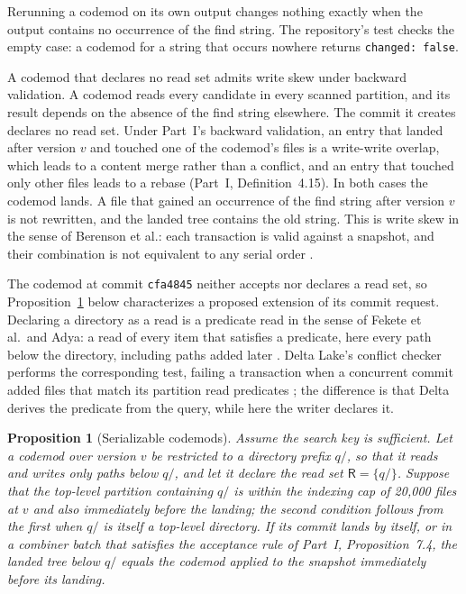 \documentclass[11pt,letterpaper]{article}
\newtheorem{proposition}[theorem]{Proposition}
\theoremstyle{definition}
\theoremstyle{remark}
\newcommand{\R}{\mathsf{R}}
\DeclareRobustCommand{\code}[1]{{\def\_{\textunderscore\allowbreak}\texttt{#1}}}
\begin{document}
Rerunning a codemod on its own output changes nothing exactly when the output contains no occurrence of the find string. The repository's test checks the empty case: a codemod for a string that occurs nowhere returns \code{changed: false}.

A codemod that declares no read set admits write skew under backward validation. A codemod reads every candidate in every scanned partition, and its result depends on the absence of the find string elsewhere. The commit it creates declares no read set. Under Part~I's backward validation, an entry that landed after version $v$ and touched one of the codemod's files is a write-write overlap, which leads to a content merge rather than a conflict, and an entry that touched only other files leads to a rebase (Part~I, Definition~4.15). In both cases the codemod lands. A file that gained an occurrence of the find string after version $v$ is not rewritten, and the landed tree contains the old string. This is write skew in the sense of Berenson et al.: each transaction is valid against a snapshot, and their combination is not equivalent to any serial order \cite{berenson1995critique}.

The codemod at commit \code{cfa4845} neither accepts nor declares a read set, so Proposition~\ref{prop:pdd:serializable} below characterizes a proposed extension of its commit request. Declaring a directory as a read is a predicate read in the sense of Fekete et al.\ and Adya: a read of every item that satisfies a predicate, here every path below the directory, including paths added later \cite[Definition~2.1]{fekete2005serializable} \cite{adya1999thesis}. Delta Lake's conflict checker performs the corresponding test, failing a transaction when a concurrent commit added files that match its partition read predicates \cite{deltaconflictsrc}; the difference is that Delta derives the predicate from the query, while here the writer declares it.

\begin{proposition}[Serializable codemods]
\label{prop:pdd:serializable}
Assume the search key is sufficient. Let a codemod over version $v$ be restricted to a directory prefix $q/$, so that it reads and writes only paths below $q/$, and let it declare the read set $\R=\{q/\}$. Suppose that the top-level partition containing $q/$ is within the indexing cap of 20,000 files at $v$ and also immediately before the landing; the second condition follows from the first when $q/$ is itself a top-level directory. If its commit lands by itself, or in a combiner batch that satisfies the acceptance rule of Part~I, Proposition~7.4, the landed tree below $q/$ equals the codemod applied to the snapshot immediately before its landing.
\end{proposition}
\end{document}
